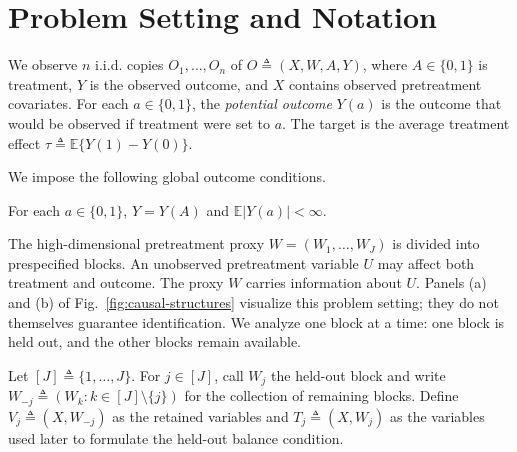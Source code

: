 \section{Problem Setting and Notation}
\label{sec:problem-setting}

 We observe $n$ i.i.d. copies $O_1,\ldots,O_n$ of $O\triangleq(X,W,A,Y)$, where $A\in\{0,1\}$ is treatment, $Y$ is the observed outcome, and $X$ contains observed pretreatment covariates. For each $a\in\{0,1\}$, the \emph{potential outcome} $Y(a)$ is the outcome that would be observed if treatment were set to $a$. The target is the average treatment effect $\tau\triangleq\mathbb E\{Y(1)-Y(0)\}$.

We impose the following global outcome conditions.

\begin{assumption}
\label{ass:consistency}
For each $a\in\{0,1\}$, $Y=Y(A)$ and $\mathbb E|Y(a)|<\infty$.
\end{assumption}

The high-dimensional pretreatment proxy $W=(W_1,\ldots,W_J)$ is divided into prespecified blocks. An unobserved pretreatment variable $U$ may affect both treatment and outcome. The proxy $W$ carries information about $U$. Panels (a) and (b) of Fig.~\ref{fig:causal-structures} visualize this problem setting; they do not themselves guarantee identification. We analyze one block at a time: one block is held out, and the other blocks remain available.

\begin{definition}
\label{def:held-out-remaining-blocks}
Let $[J]\triangleq\{1,\ldots,J\}$. For $j\in[J]$, call $W_j$ the held-out block and write $W_{-j}\triangleq(W_k:k\in[J]\setminus\{j\})$ for the collection of remaining blocks. Define $V_j\triangleq(X,W_{-j})$ as the retained variables and $T_j\triangleq(X,W_j)$ as the variables used later to formulate the held-out balance condition.
\end{definition}
